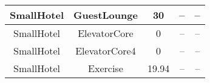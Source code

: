 \begin{table}
\begin{tabular}{|c|c|c|c|c|}
SmallHotel             & GuestLounge             & 30                                                                                                            & --                                & --                                                                                                             \\ \hline
SmallHotel             & ElevatorCore            & 0                                                                                                             & --                                & --                                                                                                             \\ \hline
SmallHotel             & ElevatorCore4           & 0                                                                                                             & --                                & --                                                                                                             \\ \hline
SmallHotel             & Exercise                & 19.94                                                                                                         & --                                & --                                                                                                             \\ \hline
\end{tabular}
\end{table}